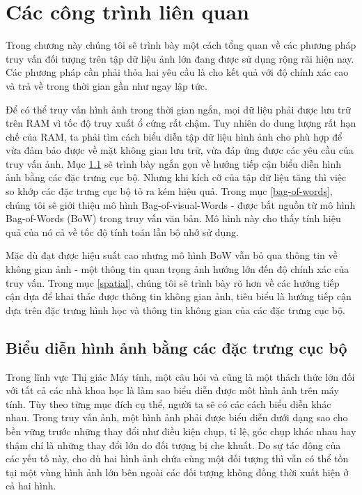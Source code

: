 \chapter{Các công trình liên quan}
\label{chapter:related}
\ifpdf
    \graphicspath{{Chapter2/Chapter2Figs/PNG/}{Chapter2/Chapter2Figs/PDF/}{Chapter2/Chapter2Figs/}}
\else
    \graphicspath{{Chapter2/Chapter2Figs/EPS/}{Chapter2/Chapter2Figs/}}
\fi


Trong chương này chúng tôi sẽ trình bày một cách tổng quan về các phương pháp truy vấn đối tượng trên tập dữ liệu ảnh lớn đang được sử dụng rộng rãi hiện nay. Các phương pháp cần phải thỏa hai yêu cầu là cho kết quả với độ chính xác cao và trả về trong thời gian gần như ngay lập tức.

Để có thể truy vấn hình ảnh trong thời gian ngắn, mọi dữ liệu phải được lưu trữ trên RAM vì tốc độ truy xuất ổ cứng rất chậm. Tuy nhiên do dung lượng rất hạn chế của RAM, ta phải tìm cách biểu diễn tập dữ liệu hình ảnh cho phù hợp để vừa đảm bảo được về mặt không gian lưu trữ, vừa đáp ứng được các yêu cầu của truy vấn ảnh. Mục \ref{local-features} sẽ trình bày ngắn gọn về hướng tiếp cận biểu diễn hình ảnh bằng các đặc trưng cục bộ. Nhưng khi kích cỡ của tập dữ liệu tăng thì việc so khớp các đặc trưng cục bộ tỏ ra kém hiệu quả. Trong mục \ref{bag-of-words}, chúng tôi sẽ giới thiệu mô hình Bag-of-visual-Words -  được bắt nguồn từ mô hình Bag-of-Words (BoW) trong truy vấn văn bản. Mô hình này cho thấy tính hiệu quả của nó cả về tốc độ tính toán lẫn bộ nhớ sử dụng.

Mặc dù đạt được hiệu suất cao nhưng mô hình BoW vẫn bỏ qua thông tin về không gian ảnh - một thông tin quan trọng ảnh hướng lớn đến độ chính xác của truy vấn. Trong mục \ref{spatial}, chúng tôi sẽ trình bày rõ hơn về các hướng tiếp cận dựa để khai thác được thông tin không gian ảnh, tiêu biểu là hướng tiếp cận dựa trên đặc trưng hình học và thông tin không gian của các đặc trưng cục bộ.


\section{Biểu diễn hình ảnh bằng các đặc trưng cục bộ}
\label{local-features}

Trong lĩnh vực Thị giác Máy tính, một câu hỏi và cũng là một thách thức lớn đối với tất cả các nhà khoa học là làm sao biểu diễn được môt hình ảnh trên máy tính. Tùy theo từng mục đích cụ thể, người ta sẽ có các cách biểu diễn khác nhau. Trong truy vấn ảnh, một hình ảnh phải được biểu diễn dưới dạng sao cho bền vững trước những thay đổi như điều kiện chụp, tỉ lệ, góc chụp khác nhau hay thậm chí là những thay đổi lớn do đối tượng bị che khuất. Do sự tác động của các yếu tố này, cho dù hai hình ảnh chứa cùng một đối tượng thì vẫn có thể tồn tại một vùng hình ảnh lớn bên ngoài các đối tượng không đồng thời xuất hiện ở cả hai hình.

